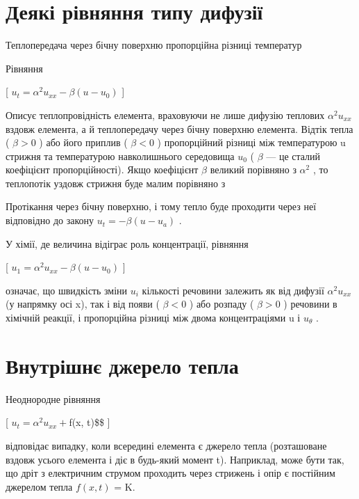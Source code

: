 \documentclass[
]{article}
\begin{document}
\section{Деякі рівняння типу
дифузії}\label{ux434ux435ux44fux43aux456-ux440ux456ux432ux43dux44fux43dux43dux44f-ux442ux438ux43fux443-ux434ux438ux444ux443ux437ux456ux457}

Теплопередача через бічну поверхню пропорційна різниці температур

Рівняння

{[} \(u_t = \alpha^2 u_{xx} - \beta (u - u_0)\) {]}

Описує теплопровідність елемента, враховуючи не лише дифузію теплових
\(\alpha^2 u_{xx}\) вздовж елемента, а й теплопередачу через бічну
поверхню елемента. Відтік тепла ( \(\beta > 0\) ) або його приплив (
\(\beta < 0\) ) пропорційний різниці між температурою u стрижня та
температурою навколишнього середовища \(u_0\) ( \(\beta\) --- це сталий
коефіцієнт пропорційності). Якщо коефіцієнт \(\beta\) великий порівняно
з \(\alpha^2\) , то теплопотік уздовж стрижня буде малим порівняно з

Протікання через бічну поверхню, і тому тепло буде проходити через неї
відповідно до закону \(u_t = -\beta (u - u_a)\) .

У хімії, де величина відіграє роль концентрації, рівняння

{[} \(u_1 = \alpha^2 u_{xx} - \beta (u - u_0)\) {]}

означає, що швидкість зміни \(u_i\) кількості речовини залежить як від
дифузії \(\alpha^2 u_{xx}\) (у напрямку осі x), так і від появи (
\(\beta < 0\) ) або розпаду ( \(\beta > 0\) ) речовини в хімічній
реакції, і пропорційна різниці між двома концентраціями u і
\(u_{\theta}\) .

\section{Внутрішнє джерело
тепла}\label{ux432ux43dux443ux442ux440ux456ux448ux43dux454-ux434ux436ux435ux440ux435ux43bux43e-ux442ux435ux43fux43bux430}

Неоднородне рівняння

{[} \(u_t = \alpha^2 u_{xx} +\)f(x, t)\$\$ {]}

відповідає випадку, коли всередині елемента є джерело тепла (розташоване
вздовж усього елемента і діє в будь-який момент t). Наприклад, може бути
так, що дріт з електричним струмом проходить через стрижень і опір є
постійним джерелом тепла \(f(x,t)\) = K.
\end{document}

